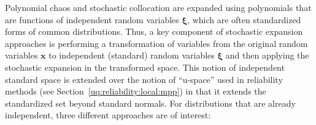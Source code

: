Polynomial chaos and stochastic collocation are expanded using
polynomials that are functions of independent random variables
$\boldsymbol{\xi}$, which are often standardized forms of common
distributions.  Thus, a key component of stochastic expansion
approaches is performing a transformation of variables from the
original random variables $\boldsymbol{x}$ to independent (standard)
random variables $\boldsymbol{\xi}$ and then applying the stochastic
expansion in the transformed space.  %
This notion of independent standard space is extended over the 
notion of ``u-space'' used in reliability methods (see
Section~\ref{uq:reliability:local:mpp}) 
in that it extends the standardized set beyond standard normals.
For distributions that are already independent, three different 
approaches are of interest:
